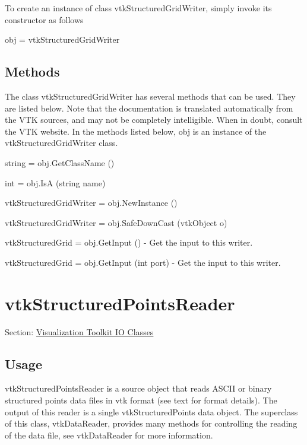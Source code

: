 To create an instance of class vtk\-Structured\-Grid\-Writer, simply invoke its constructor as follows \begin{DoxyVerb}  obj = vtkStructuredGridWriter
\end{DoxyVerb}
 \hypertarget{vtkwidgets_vtkxyplotwidget_Methods}{}\subsection{Methods}\label{vtkwidgets_vtkxyplotwidget_Methods}
The class vtk\-Structured\-Grid\-Writer has several methods that can be used. They are listed below. Note that the documentation is translated automatically from the V\-T\-K sources, and may not be completely intelligible. When in doubt, consult the V\-T\-K website. In the methods listed below, {\ttfamily obj} is an instance of the vtk\-Structured\-Grid\-Writer class. 
\begin{DoxyItemize}
\item {\ttfamily string = obj.\-Get\-Class\-Name ()}  
\item {\ttfamily int = obj.\-Is\-A (string name)}  
\item {\ttfamily vtk\-Structured\-Grid\-Writer = obj.\-New\-Instance ()}  
\item {\ttfamily vtk\-Structured\-Grid\-Writer = obj.\-Safe\-Down\-Cast (vtk\-Object o)}  
\item {\ttfamily vtk\-Structured\-Grid = obj.\-Get\-Input ()} -\/ Get the input to this writer.  
\item {\ttfamily vtk\-Structured\-Grid = obj.\-Get\-Input (int port)} -\/ Get the input to this writer.  
\end{DoxyItemize}\hypertarget{vtkio_vtkstructuredpointsreader}{}\section{vtk\-Structured\-Points\-Reader}\label{vtkio_vtkstructuredpointsreader}
Section\-: \hyperlink{sec_vtkio}{Visualization Toolkit I\-O Classes} \hypertarget{vtkwidgets_vtkxyplotwidget_Usage}{}\subsection{Usage}\label{vtkwidgets_vtkxyplotwidget_Usage}
vtk\-Structured\-Points\-Reader is a source object that reads A\-S\-C\-I\-I or binary structured points data files in vtk format (see text for format details). The output of this reader is a single vtk\-Structured\-Points data object. The superclass of this class, vtk\-Data\-Reader, provides many methods for controlling the reading of the data file, see vtk\-Data\-Reader for more information.

